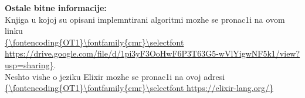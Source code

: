 \documentclass[a4paper]{article}
\newcommand{\Lat}{\fontencoding{OT1}\fontfamily{cmr}\selectfont}
\begin{document}
\begin{flushleft}
{\begin{minipage}[t][12cm]{17cm}
\textbf{Ostale bitne informacije:}\\
Knjiga u kojoj su opisani implemntirani algoritmi mozhe se pronac1i na ovom linku \\
\url{{\Lat https://drive.google.com/file/d/1pi3yF3OoHwF6P3T63G5-wVlYigwNF5k1/view?usp=sharing}}.\\
Neshto vishe o jeziku {\Lat Elixir} mozhe se pronac1i na ovoj adresi \\
\url{{\Lat https://elixir-lang.org/}}
\\





\end{minipage}
}
\end{flushleft}
\end{document}
